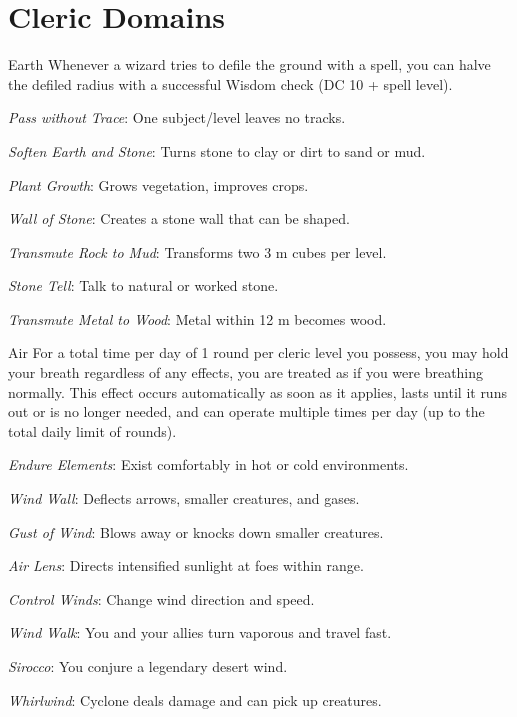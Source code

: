 \section{Cleric Domains}

{Earth}
{Whenever a wizard tries to defile the ground with a spell, you can halve the defiled radius with a successful Wisdom check (DC 10 + spell level).}
{
	\item \textit{Pass without Trace}: One subject/level leaves no tracks.
	\item \textit{Soften Earth and Stone}: Turns stone to clay or dirt to sand or mud.
	\item \textit{Plant Growth}: Grows vegetation, improves crops.
	\item \textit{Wall of Stone}: Creates a stone wall that can be shaped.
	\item \textit{Transmute Rock to Mud}: Transforms two 3 m cubes per level.
	\item \textit{Stone Tell}: Talk to natural or worked stone.
	\item \textit{Transmute Metal to Wood}: Metal within 12 m becomes wood.
	\item 
	\item 
}

{Air}
{For a total time per day of 1 round per cleric level you possess, you may hold your breath regardless of any effects, you are treated as if you were breathing normally. This effect occurs automatically as soon as it applies, lasts until it runs out or is no longer needed, and can operate multiple times per day (up to the total daily limit of rounds).}
{
	\item \textit{Endure Elements}: Exist comfortably in hot or cold environments.
	\item \textit{Wind Wall}: Deflects arrows, smaller creatures, and gases.
	\item \textit{Gust of Wind}: Blows away or knocks down smaller creatures.
	\item \textit{Air Lens}: Directs intensified sunlight at foes within range.
	\item \textit{Control Winds}: Change wind direction and speed.
	\item \textit{Wind Walk}: You and your allies turn vaporous and travel fast.
	\item \textit{Sirocco}: You conjure a legendary desert wind.
	\item \textit{Whirlwind}: Cyclone deals damage and can pick up creatures.
	\item 
}


